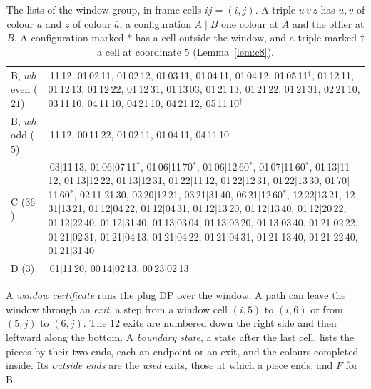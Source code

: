 \documentclass[11pt]{article}
\newcommand{\ent}[1]{\textsf{#1}}
\begin{document}
\begin{table}[htbp]
\centering\footnotesize
\begin{tabular}{@{}>{\raggedright\arraybackslash}p{}>{\raggedright\arraybackslash}p{}@{}}
\toprule
\ent{B}, $wh$ even ($21$) & 00\,11\,12, 01\,02\,11, 01\,02\,12, 01\,03\,11, 01\,04\,11,
  01\,04\,12, 01\,05\,11$^\dagger$, 01\,12\,11, 01\,12\,13, 01\,12\,22, 01\,12\,31, 01\,13\,03,
  01\,21\,13, 01\,21\,22, 01\,21\,31, 02\,21\,10, 03\,11\,10, 04\,11\,10, 04\,21\,10, 04\,21\,12,
  05\,11\,10$^\dagger$ \\
\ent{B}, $wh$ odd ($5$) & 00\,11\,12, 00\,11\,22, 01\,02\,11, 01\,04\,11, 04\,11\,10 \\
\ent{C} ($36$) & 01\,03$\mid$11\,13, 01\,06$\mid$07\,11$^*$, 01\,06$\mid$11\,70$^*$,
  01\,06$\mid$12\,60$^*$, 01\,07$\mid$11\,60$^*$, 01\,13$\mid$11\,12, 01\,13$\mid$12\,22,
  01\,13$\mid$12\,31, 01\,22$\mid$11\,12, 01\,22$\mid$12\,31, 01\,22$\mid$13\,30,
  01\,70$\mid$11\,60$^*$, 02\,11$\mid$21\,30, 02\,20$\mid$12\,21, 03\,21$\mid$31\,40,
  06\,21$\mid$12\,60$^*$, 12\,22$\mid$13\,21, 12\,31$\mid$13\,21, 01\,12$\mid$04\,22,
  01\,12$\mid$04\,31, 01\,12$\mid$13\,20, 01\,12$\mid$13\,40, 01\,12$\mid$20\,22,
  01\,12$\mid$22\,40, 01\,12$\mid$31\,40, 01\,13$\mid$03\,04, 01\,13$\mid$03\,20,
  01\,13$\mid$03\,40, 01\,21$\mid$02\,22, 01\,21$\mid$02\,31, 01\,21$\mid$04\,13,
  01\,21$\mid$04\,22, 01\,21$\mid$04\,31, 01\,21$\mid$13\,40, 01\,21$\mid$22\,40,
  01\,21$\mid$31\,40 \\
\ent{D} ($3$) & 00\,01$\mid$11\,20, 00\,14$\mid$02\,13, 00\,23$\mid$02\,13 \\
\bottomrule
\end{tabular}
\caption{The lists of the window group, in frame cells $ij=(i,j)$. A triple $u\,v\,z$ has $u,v$ of
colour $a$ and $z$ of colour $\bar a$, a configuration $A\mid B$ one colour at $A$ and the other at
$B$. A configuration marked $*$ has a cell outside the window, and a triple marked $\dagger$ a cell at
coordinate $5$ (Lemma~\ref{lem:c8}).}
\label{tab:lists}
\end{table}

A \emph{window certificate} runs the plug DP over the window. A path can leave the window
through an \emph{exit}, a step from a window cell $(i,5)$ to $(i,6)$ or from $(5,j)$ to $(6,j)$. The $12$ exits are numbered down the right side and then leftward along the
bottom. A \emph{boundary state}, a state after the last cell, lists the pieces by their two ends,
each an endpoint or an exit, and the colours completed inside. Its \emph{outside ends} are the
\emph{used} exits, those at which a piece ends, and $F$ for \ent{B}.
\end{document}
